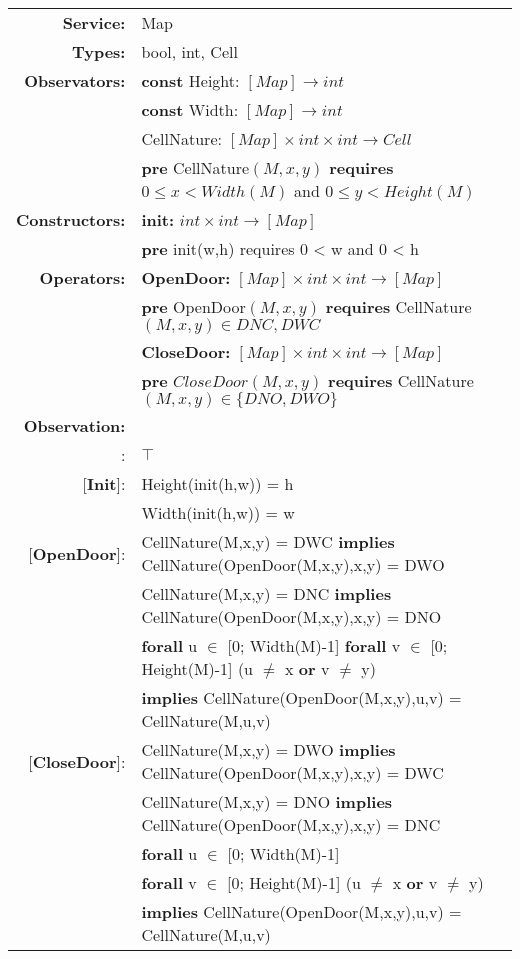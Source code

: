 \begin{tabular}{rl}
\textbf{Service:} & \quad	Map\\
\textbf{Types:} &\quad	bool, int, Cell\\ 
\textbf{Observators:} &
\textbf{const} Height: $[Map] \rightarrow int$ \\
&
\textbf{const} Width: $[Map] \rightarrow int$ \\
& 
CellNature: $[Map] \times int \times int \rightarrow Cell$ \\
&
\quad \textbf{pre} CellNature$(M,x,y)$  \textbf{requires} $ 0 \leq x < Width(M)$  and $ 0 \leq y < Height(M)$\\
\textbf{Constructors:} &
\textbf{init:} $int \times int \rightarrow [Map]$ \\
& \quad \textbf{pre} init(w,h) requires 0 < w and 0 < h\\
\textbf{Operators:} & 
\textbf{OpenDoor:} $[Map] \times int \times int \rightarrow [Map]$\\
& \quad\textbf{pre} OpenDoor$(M,x,y)$ \textbf{requires} CellNature$(M,x,y) \in {DNC, DWC }$\\
&
\textbf{CloseDoor:} $[Map] \times int \times int \rightarrow [Map]$\\
& \quad \textbf{pre} $CloseDoor(M,x,y)$ \textbf{requires} CellNature$(M,x,y) \in \{DNO, DWO\}$\\
\textbf{Observation:}\\
:&  $\top$\\

[\textbf{Init}]: & Height(init(h,w)) = h\\
& Width(init(h,w)) = w\\

[\textbf{OpenDoor}]: & CellNature(M,x,y) = DWC \textbf{implies} CellNature(OpenDoor(M,x,y),x,y) = DWO\\
&
CellNature(M,x,y) = DNC \textbf{implies} CellNature(OpenDoor(M,x,y),x,y) = DNO\\
&
\textbf{forall} u $\in$ [0; Width(M)-1] \textbf{forall} v $\in$ [0; Height(M)-1] (u $\neq$ x \textbf{or} v $\neq$ y)\\
&
\quad\textbf{implies} CellNature(OpenDoor(M,x,y),u,v) = CellNature(M,u,v)\\

[\textbf{CloseDoor}]: &
CellNature(M,x,y) = DWO \textbf{implies} CellNature(OpenDoor(M,x,y),x,y) = DWC\\
&
CellNature(M,x,y) = DNO \textbf{implies} CellNature(OpenDoor(M,x,y),x,y) = DNC\\
&
\textbf{forall} u $\in$ [0; Width(M)-1] \\
&
\quad \textbf{forall} v $\in$ [0; Height(M)-1] (u $\neq$ x \textbf{or} v $\neq$ y) \\
&
\quad\quad\textbf{implies} CellNature(OpenDoor(M,x,y),u,v) = CellNature(M,u,v)

\end{tabular}